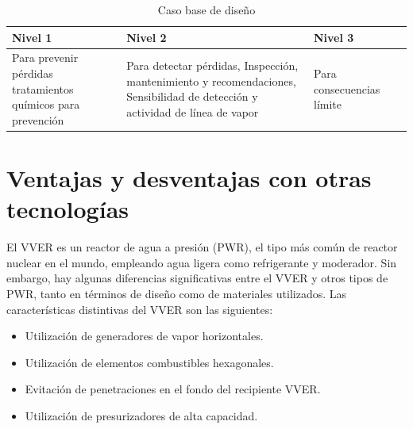\documentclass[]{article}
\begin{document}
\begin{table}[h!]
	\centering
	\begin{tabular}{||p{5cm}|p{5cm}|p{5cm}|p{5cm}||}
		\hline
		
		Nivel 1 & Nivel 2 & Nivel 3 \\ \hline
	   Para prevenir pérdidas tratamientos químicos para prevención & Para detectar pérdidas, Inspección, mantenimiento y recomendaciones, Sensibilidad de detección y actividad de línea de vapor & Para consecuencias límite \\ \hline
	\end{tabular}
	\caption{Caso base de diseño}
\end{table}


\section{Ventajas y desventajas con otras tecnologías}

El VVER es un reactor de agua a presión (PWR), el tipo más común de reactor nuclear en el mundo, empleando agua ligera como refrigerante y moderador. Sin embargo, hay algunas diferencias significativas entre el VVER y otros tipos de PWR, tanto en términos de diseño como de materiales utilizados. Las características distintivas del VVER son las siguientes:\\

\begin{itemize}
	\item Utilización de generadores de vapor horizontales.
	\item Utilización de elementos combustibles hexagonales.
	\item Evitación de penetraciones en el fondo del recipiente VVER.
	\item Utilización de presurizadores de alta capacidad.
\end{itemize} 
\citep{Rosatom}
\end{document}
